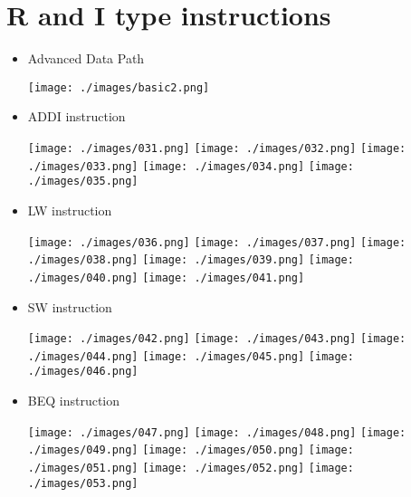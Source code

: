 \documentclass[a4paper, 12pt]{article}
\begin{document}
	\section{R and I type instructions}
	\begin{itemize}
		\item Advanced Data Path
		
		\texttt{[image: ./images/basic2.png]}
		
		\newpage
		
		\item ADDI instruction
		
		\texttt{[image: ./images/031.png]}
		\texttt{[image: ./images/032.png]}
		\texttt{[image: ./images/033.png]}
		\texttt{[image: ./images/034.png]}
		\texttt{[image: ./images/035.png]}
		
		\newpage
		
		\item LW instruction
		
		\texttt{[image: ./images/036.png]}
		\texttt{[image: ./images/037.png]}
		\texttt{[image: ./images/038.png]}
		\texttt{[image: ./images/039.png]}
		\texttt{[image: ./images/040.png]}
		\texttt{[image: ./images/041.png]}
		
		\newpage
		
		\item SW instruction
		
		\texttt{[image: ./images/042.png]}
		\texttt{[image: ./images/043.png]}
		\texttt{[image: ./images/044.png]}
		\texttt{[image: ./images/045.png]}
		\texttt{[image: ./images/046.png]}
		
		\newpage
		
		\item BEQ instruction
		
		\texttt{[image: ./images/047.png]}
		\texttt{[image: ./images/048.png]}
		\texttt{[image: ./images/049.png]}
		\texttt{[image: ./images/050.png]}
		\texttt{[image: ./images/051.png]}
		\texttt{[image: ./images/052.png]}
		\texttt{[image: ./images/053.png]}
		
	\end{itemize}
	
\end{document}
